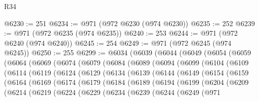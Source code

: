 \begin{lexlean}{R34}
\begin{coremodule}
@6230 := 251
@6234 := @971 (@972 @6230 (@974 @6230))
@6235 := 252
@6239 := @971 (@972 @6235 (@974 @6235))
@6240 := 253
@6244 := @971 (@972 @6240 (@974 @6240))
@6245 := 254
@6249 := @971 (@972 @6245 (@974 @6245))
@6250 := 255
@6299 := @6034
    (@6039
      (@6044
        (@6049
          (@6054
            (@6059
              (@6064
                (@6069
                  (@6074
                    (@6079
                      (@6084
                        (@6089
                          (@6094
                            (@6099
                              (@6104
                                (@6109
                                  (@6114
                                    (@6119
                                      (@6124
                                        (@6129
                                          (@6134
                                            (@6139
                                              (@6144
                                                (@6149
                                                  (@6154
                                                    (@6159
                                                      (@6164
                                                        (@6169
                                                          (@6174
                                                            (@6179
                                                              (@6184
                                                                (@6189
                                                                  (@6194
                                                                    (@6199
                                                                      (@6204
                                                                        (@6209
                                                                          (@6214
                                                                            (@6219
                                                                              (@6224
                                                                                (@6229
                                                                                  (@6234
                                                                                    (@6239
                                                                                      (@6244
                                                                                        (@6249
                                                                                          (@971

\end{coremodule}
\end{lexlean}

